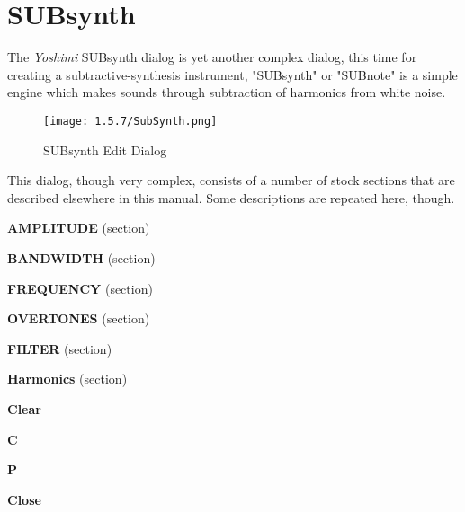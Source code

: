 %
%
%

\section{SUBsynth}
\label{sec:subsynth}

   The \textsl{Yoshimi} SUBsynth dialog is yet another complex dialog, this time
   for creating a subtractive-synthesis instrument,
   "SUBsynth" or "SUBnote" is a simple engine which makes sounds through
   subtraction of harmonics from white noise.  \cite{zyndoc}

\begin{figure}[H]
   \centering
   \texttt{[image: 1.5.7/SubSynth.png]}
   \caption{SUBsynth Edit Dialog}
   \label{fig:subsynth_edit_dialog}
\end{figure}

   This dialog, though very complex, consists of a number of stock sections
   that are described elsewhere in this manual.
   Some descriptions are repeated here, though.

   \begin{enumber}
      \item \textbf{AMPLITUDE} (section)
      \item \textbf{BANDWIDTH} (section)
      \item \textbf{FREQUENCY} (section)
      \item \textbf{OVERTONES} (section)
      \item \textbf{FILTER} (section)
      \item \textbf{Harmonics} (section)
      \item \textbf{Clear}
      \item \textbf{C}
      \item \textbf{P}
      \item \textbf{Close}
   \end{enumber}

